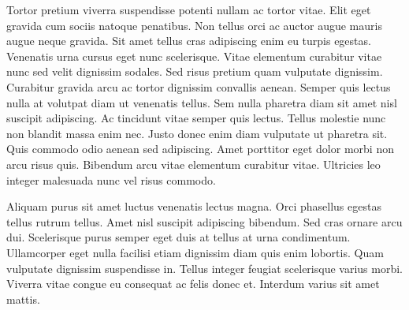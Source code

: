 Tortor pretium viverra suspendisse potenti nullam ac tortor vitae. Elit eget gravida cum sociis natoque penatibus. Non tellus orci ac auctor augue mauris augue neque gravida. Sit amet tellus cras adipiscing enim eu turpis egestas. Venenatis urna cursus eget nunc scelerisque. Vitae elementum curabitur vitae nunc sed velit dignissim sodales. Sed risus pretium quam vulputate dignissim. Curabitur gravida arcu ac tortor dignissim convallis aenean. Semper quis lectus nulla at volutpat diam ut venenatis tellus. Sem nulla pharetra diam sit amet nisl suscipit adipiscing. Ac tincidunt vitae semper quis lectus. Tellus molestie nunc non blandit massa enim nec. Justo donec enim diam vulputate ut pharetra sit. Quis commodo odio aenean sed adipiscing. Amet porttitor eget dolor morbi non arcu risus quis. Bibendum arcu vitae elementum curabitur vitae. Ultricies leo integer malesuada nunc vel risus commodo.

Aliquam purus sit amet luctus venenatis lectus magna. Orci phasellus egestas tellus rutrum tellus. Amet nisl suscipit adipiscing bibendum. Sed cras ornare arcu dui. Scelerisque purus semper eget duis at tellus at urna condimentum. Ullamcorper eget nulla facilisi etiam dignissim diam quis enim lobortis. Quam vulputate dignissim suspendisse in. Tellus integer feugiat scelerisque varius morbi. Viverra vitae congue eu consequat ac felis donec et. Interdum varius sit amet mattis.